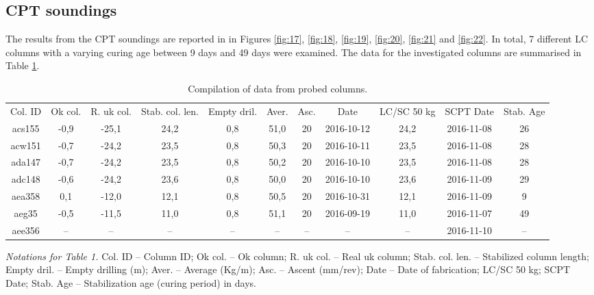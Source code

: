 \documentclass[final,3p,times,onecolumn,authoryear]{elsarticle}
\begin{document}
\subsection{CPT soundings}

The results from the CPT soundings are reported in in Figures \ref{fig:17}, \ref{fig:18}, \ref{fig:19}, \ref{fig:20}, \ref{fig:21} and \ref{fig:22}. In total, 7 different LC columns with a varying curing age between 9 days and 49 days were examined. The data for the investigated columns are summarised in Table \ref{tab:1}.

\begin{table}[t]
\begin{threeparttable}
   \caption{Compilation of data from probed columns.}
  \centering
  \footnotesize
  \begin{tabular}{| c c c c c c c c c c c |}
    Col. ID & Ok col. & R. uk col. & Stab. col. len. & Empty dril. & Aver. & Asc. & Date & LC/SC 50 kg & SCPT Date & Stab. Age \\
    acs155 & -0,9 & -25,1 & 24,2 & 0,8 & 51,0 & 20 & 2016-10-12 & 24,2 & 2016-11-08 & 26 \\
    acw151 & -0,7 & -24,2 & 23,5 & 0,8 & 50,3 & 20 & 2016-10-11 & 23,5 & 2016-11-08 & 28 \\
    ada147 & -0,7 & -24,2 & 23,5 & 0,8 & 50,2 & 20 & 2016-10-10 & 23,5 & 2016-11-08 & 28 \\
    adc148 & -0,6 & -24,2 & 23,6 & 0,8 & 50,0 & 20 & 2016-10-10 & 23,6 & 2016-11-09 & 29 \\
    aea358 & 0,1 & -12,0 & 12,1 & 0,8 & 50,5 & 20 & 2016-10-31 & 12,1 & 2016-11-09 & 9 \\
    aeg35 & -0,5 & -11,5 & 11,0 & 0,8 & 51,1 & 20 & 2016-09-19 & 11,0 & 2016-11-07 & 49 \\
    aee356 & -- & -- & -- & -- & -- & -- & -- & -- & 2016-11-10 & --
  \end{tabular}
  \label{tab:1}
   \begin{tablenotes}
      \footnotesize
      	\item \emph{Notations for Table 1.} Col. ID -- Column ID; Ok col. -- Ok column; R. uk col. -- Real uk column; Stab. col. len. -- Stabilized column length; Empty dril. -- Empty drilling (m); Aver. -- Average (Kg/m); Asc. -- Ascent (mm/rev); Date -- Date of fabrication; LC/SC 50 kg; SCPT Date; Stab. Age -- Stabilization age (curing period) in days.
    \end{tablenotes}
  \end{threeparttable}
\end{table}
\end{document}
